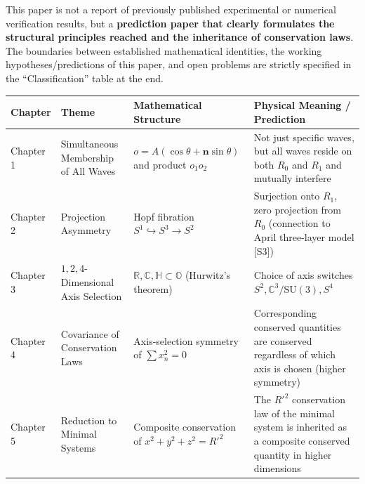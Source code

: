 \documentclass[
  a4paper,
]{article}
\newcounter{none} %
\begin{document}
This paper is not a report of previously published experimental or
numerical verification results, but a \textbf{prediction paper that
clearly formulates the structural principles reached and the inheritance
of conservation laws}. The boundaries between established mathematical
identities, the working hypotheses/predictions of this paper, and open
problems are strictly specified in the ``Classification'' table at the
end.

{\def\LTcaptype{none} %
\begin{longtable}[]{@{}
  >{\raggedright\arraybackslash}p{}
  >{\raggedright\arraybackslash}p{}
  >{\raggedright\arraybackslash}p{}
  >{\raggedright\arraybackslash}p{}@{}}
\toprule\noalign{}
\begin{minipage}[b]{\linewidth}\raggedright
Chapter
\end{minipage} & \begin{minipage}[b]{\linewidth}\raggedright
Theme
\end{minipage} & \begin{minipage}[b]{\linewidth}\raggedright
Mathematical Structure
\end{minipage} & \begin{minipage}[b]{\linewidth}\raggedright
Physical Meaning / Prediction
\end{minipage} \\
\midrule\noalign{}
\endhead
\bottomrule\noalign{}
\endlastfoot
Chapter 1 & Simultaneous Membership of All Waves &
\(o = A(\cos\theta + \mathbf{n}\sin\theta)\) and product \(o_1 o_2\) &
Not just specific waves, but all waves reside on both \(R_0\) and
\(R_1\) and mutually interfere \\
Chapter 2 & Projection Asymmetry & Hopf fibration
\(S^1 \hookrightarrow S^3 \to S^2\) & Surjection onto \(R_1\), zero
projection from \(R_0\) (connection to April three-layer model
{[}S3{]}) \\
Chapter 3 & \(1, 2, 4\)-Dimensional Axis Selection &
\(\mathbb{R}, \mathbb{C}, \mathbb{H} \subset \mathbb{O}\) (Hurwitz's
theorem) & Choice of axis switches
\(S^2, \mathbb{C}^3/\mathrm{SU}(3), S^4\) \\
Chapter 4 & Covariance of Conservation Laws & Axis-selection symmetry of
\(\sum x_n^2 = 0\) & Corresponding conserved quantities are conserved
regardless of which axis is chosen (higher symmetry) \\
Chapter 5 & Reduction to Minimal Systems & Composite conservation of
\(x^2+y^2+z^2=R'^2\) & The \(R'^2\) conservation law of the minimal
system is inherited as a composite conserved quantity in higher
dimensions \\
\end{longtable}
}
\end{document}
